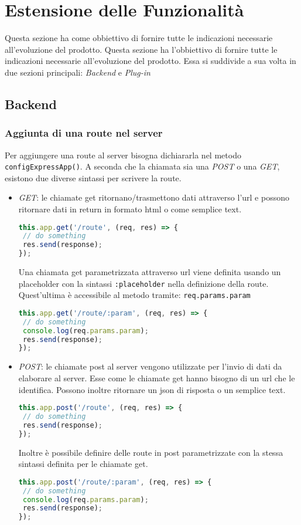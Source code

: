 \section{Estensione delle Funzionalità}\label{Estensione}
Questa sezione ha come obbiettivo di fornire tutte le indicazioni necessarie all'evoluzione del prodotto. 
Questa sezione ha l'obbiettivo di fornire tutte le indicazioni necessarie all'evoluzione del prodotto. 
Essa si suddivide a sua volta in due sezioni principali: \textit{Backend} e \textit{Plug-in}

\subsection{Backend}\label{Estensione_Server}
\subsubsection{Aggiunta di una route nel server}
Per aggiungere una route al server bisogna dichiararla nel metodo \texttt{configExpressApp()}. 
A seconda che la chiamata sia una \textit{POST} o una \textit{GET}, esistono due diverse sintassi per scrivere la route.
\begin{itemize}
 \item \textit{GET}: le chiamate get ritornano/trasmettono dati attraverso l'url e possono ritornare dati in return in formato html o come semplice text.
\begin{lstlisting}[language=JavaScript]
this.app.get('/route', (req, res) => {
 // do something
 res.send(response);
});
\end{lstlisting} 
Una chiamata get parametrizzata attraverso url viene definita usando un placeholder con la sintassi \texttt{:placeholder} nella definizione della route. Quest'ultima è accessibile al metodo tramite: \texttt{req.params.param}
\begin{lstlisting}[language=JavaScript]
this.app.get('/route/:param', (req, res) => {
 // do something
 console.log(req.params.param);
 res.send(response);
});
\end{lstlisting}
\item \textit{POST}: le chiamate post al server vengono utilizzate per l'invio di dati da elaborare al server. Esse come le chiamate get hanno bisogno di un url che le identifica. Possono inoltre ritornare un json di risposta o un semplice text. 
\begin{lstlisting}[language=JavaScript]
this.app.post('/route', (req, res) => {
 // do something
 res.send(response);
});
\end{lstlisting} 
Inoltre è possibile definire delle route in post parametrizzate con la stessa sintassi definita per le chiamate get. 
\begin{lstlisting}[language=JavaScript]
this.app.post('/route/:param', (req, res) => {
 // do something
 console.log(req.params.param);
 res.send(response);
});
\end{lstlisting}
\end{itemize}


